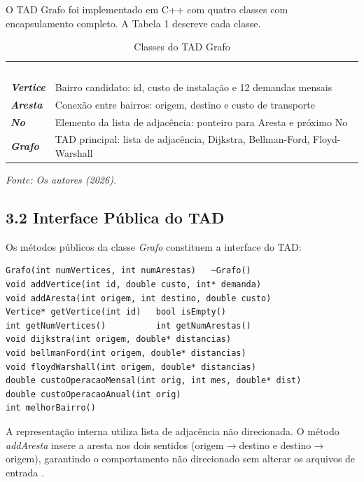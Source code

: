 \documentclass[12pt, a4paper]{article}
\begin{document}
O TAD Grafo foi implementado em C++ com quatro classes com encapsulamento completo. A Tabela 1 descreve cada classe.

\begin{table}[H]
\centering
\caption{Classes do TAD Grafo}
\begin{tabular}{>{\bfseries\itshape}lp{9cm}}
\rowcolor{azulescuro}
\textcolor{white}{\textbf{Classe}} & \textcolor{white}{\textbf{Responsabilidade}} \\
\textit{Vertice} & Bairro candidato: id, custo de instalação e 12 demandas mensais \\
\textit{Aresta}  & Conexão entre bairros: origem, destino e custo de transporte \\
\textit{No}      & Elemento da lista de adjacência: ponteiro para Aresta e próximo No \\
\textit{Grafo}   & TAD principal: lista de adjacência, Dijkstra, Bellman-Ford, Floyd-Warshall \\
\bottomrule
\end{tabular}
\label{tab:classes}
\end{table}
\vspace{-0.3cm}
\begin{center}\small\textit{Fonte: Os autores (2026).}\end{center}

\subsection*{3.2 Interface Pública do TAD}

Os métodos públicos da classe \textit{Grafo} constituem a interface do TAD:

\begin{lstlisting}
Grafo(int numVertices, int numArestas)   ~Grafo()
void addVertice(int id, double custo, int* demanda)
void addAresta(int origem, int destino, double custo)
Vertice* getVertice(int id)   bool isEmpty()
int getNumVertices()          int getNumArestas()
void dijkstra(int origem, double* distancias)
void bellmanFord(int origem, double* distancias)
void floydWarshall(int origem, double* distancias)
double custoOperacaoMensal(int orig, int mes, double* dist)
double custoOperacaoAnual(int orig)
int melhorBairro()
\end{lstlisting}

A representação interna utiliza lista de adjacência não direcionada. O método \textit{addAresta} insere a aresta nos dois sentidos (origem$\rightarrow$destino e destino$\rightarrow$origem), garantindo o comportamento não direcionado sem alterar os arquivos de entrada \cite{neves2026a, dasgupta2006}.
\end{document}
